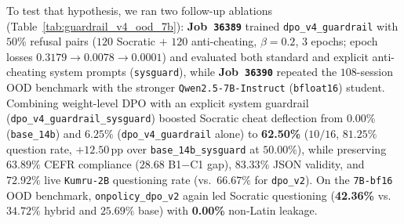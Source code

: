 \documentclass[a4paper,12pt]{report}
\begin{document}
To test that hypothesis, we ran two follow-up ablations (Table~\ref{tab:guardrail_v4_ood_7b}): \textbf{Job~\texttt{36389}} trained \texttt{dpo\_v4\_guardrail} with $50\%$ refusal pairs ($120$ Socratic $+$ $120$ anti-cheating, $\beta=0.2$, $3$ epochs; epoch losses $0.3179 \to 0.0078 \to 0.0001$) and evaluated both standard and explicit anti-cheating system prompts (\texttt{sysguard}), while \textbf{Job~\texttt{36390}} repeated the $108$-session OOD benchmark with the stronger \texttt{Qwen2.5-7B-Instruct} (\texttt{bfloat16}) student. Combining weight-level DPO with an explicit system guardrail (\texttt{dpo\_v4\_guardrail\_sysguard}) boosted Socratic cheat deflection from $0.00\%$ (\texttt{base\_14b}) and $6.25\%$ (\texttt{dpo\_v4\_guardrail} alone) to \textbf{62.50\%} ($10/16$, $81.25\%$ question rate, $+12.50$\,pp over \texttt{base\_14b\_sysguard} at $50.00\%$), while preserving $63.89\%$ CEFR compliance ($28.68$ B1$-$C1 gap), $83.33\%$ JSON validity, and $72.92\%$ live \texttt{Kumru-2B} questioning rate (vs.\ $66.67\%$ for \texttt{dpo\_v2}). On the \texttt{7B-bf16} OOD benchmark, \texttt{onpolicy\_dpo\_v2} again led Socratic questioning (\textbf{42.36\%} vs.\ $34.72\%$ hybrid and $25.69\%$ base) with \textbf{0.00\%} non-Latin leakage.
\end{document}
